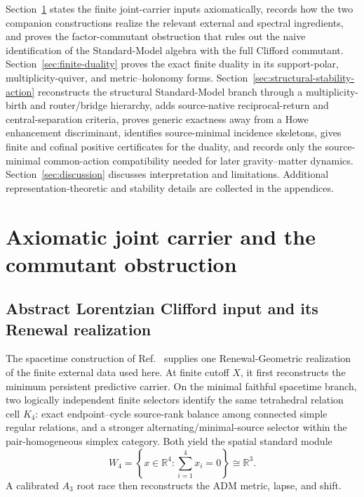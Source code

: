 \documentclass[11pt]{article}
\theoremstyle{definition}
\theoremstyle{remark}
\newcommand{\R}{\mathbb R}
\begin{document}
Section~\ref{sec:joint-interface} states the finite joint-carrier inputs
axiomatically, records how the two companion constructions realize the relevant
external and spectral ingredients, and proves the factor-commutant obstruction
that rules out the naive identification of the Standard-Model algebra with the
full Clifford commutant.
Section~\ref{sec:finite-duality} proves the exact finite duality in its
support-polar, multiplicity-quiver, and metric--holonomy forms.
Section~\ref{sec:structural-stability-action} reconstructs the structural
Standard-Model branch through a multiplicity-birth and router/bridge hierarchy,
adds source-native reciprocal-return and central-separation criteria, proves
generic exactness away from a Howe enhancement discriminant, identifies
source-minimal incidence skeletons, gives finite and cofinal positive
certificates for the duality, and records only the source-minimal common-action
compatibility needed for later gravity--matter dynamics.
Section~\ref{sec:discussion} discusses interpretation and limitations.
Additional representation-theoretic and stability details are collected in
the appendices.

\section{Axiomatic joint carrier and the commutant obstruction}
\label{sec:joint-interface}

\subsection{Abstract Lorentzian Clifford input and its Renewal realization}

The spacetime construction of Ref.~\cite{PelissierSpacetime2026} supplies one
Renewal-Geometric realization of the finite external data used here.  At
finite cutoff $X$, it first reconstructs the minimum persistent predictive
carrier.  On the minimal faithful spacetime branch, two logically independent
finite selectors identify the same tetrahedral relation cell $K_4$: exact
endpoint--cycle source-rank balance among connected simple regular relations,
and a stronger alternating/minimal-source selector within the
pair-homogeneous simplex category.  Both yield the spatial standard module
\[
W_4
=
\left\{x\in\R^4:\sum_{i=1}^{4}x_i=0\right\}
\cong\R^3.
\]
A calibrated $A_3$ root race then reconstructs the ADM metric, lapse, and
shift.
\end{document}
